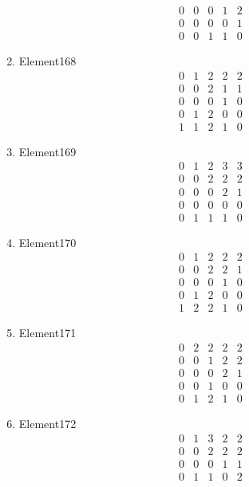 \documentclass[12pt]{article}
\begin{document}
\begin{multicols}{3}
\begin{enumerate}
\begin{equation*}
\begin{array}{ccccc}
0&0&0&1&2\\
0&0&0&0&1\\
0&0&1&1&0
\end{array}
\end{equation*}
\item Element168
\begin{equation*}
\begin{array}{ccccc}
0&1&2&2&2\\
0&0&2&1&1\\
0&0&0&1&0\\
0&1&2&0&0\\
1&1&2&1&0
\end{array}
\end{equation*}
\item Element169
\begin{equation*}
\begin{array}{ccccc}
0&1&2&3&3\\
0&0&2&2&2\\
0&0&0&2&1\\
0&0&0&0&0\\
0&1&1&1&0
\end{array}
\end{equation*}
\item Element170
\begin{equation*}
\begin{array}{ccccc}
0&1&2&2&2\\
0&0&2&2&1\\
0&0&0&1&0\\
0&1&2&0&0\\
1&2&2&1&0
\end{array}
\end{equation*}
\item Element171
\begin{equation*}
\begin{array}{ccccc}
0&2&2&2&2\\
0&0&1&2&2\\
0&0&0&2&1\\
0&0&1&0&0\\
0&1&2&1&0
\end{array}
\end{equation*}
\item Element172
\begin{equation*}
\begin{array}{ccccc}
0&1&3&2&2\\
0&0&2&2&2\\
0&0&0&1&1\\
0&1&1&0&2\\

\end{array}
\end{equation*}
\end{enumerate}
\end{multicols}
\end{document}
